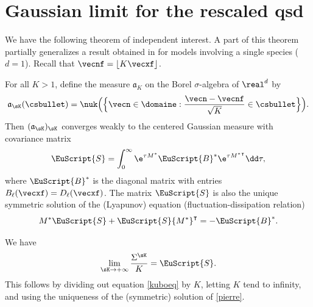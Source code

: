 \section{Gaussian limit for the rescaled qsd}

We have the following theorem of independent interest. A part of this theorem partially generalizes a result obtained
in \cite{ccm1} for models involving a single species ($d=1$). Recall that $\vecnf = \lfloor K\vecxf \rfloor$.
\begin{theorem}
\label{confinement}
For all $K>1$, define the measure $\mathfrak{a}_K$ on the Borel $\sigma$-algebra of $\real^d$ by
\[
\mathfrak{a}_{\sK}(\csbullet)=\nuk\Bigl(\Bigl\{ \vecn\in \domaine : \frac{\vecn-\vecnf}{\sqrt{K}}\in \csbullet\Bigr\}\Bigr).
\]
Then $(\mathfrak{a}_{\sK})_{\sK}$ converges weakly to the centered Gaussian measure with covariance matrix
\[
\EuScript{S}=\int_{0}^{\infty}\e^{\tau M^*}\EuScript{B}^*\e^{\tau {M^*}^{\intercal}}\dd\tau,
\]
where $\EuScript{B}^*$ is the diagonal matrix with entries $B_{\ell}(\vecxf)=D_{\ell}(\vecxf)$.
The matrix $\EuScript{S}$ is also the unique symmetric solution of the (Lyapunov)
equation (fluctuation-dissipation relation)
\begin{equation}\label{pierre}
M^* \EuScript{S}+\EuScript{S} {M^*}^{\intercal}=-\EuScript{B}^*.
\end{equation}
\end{theorem}

\begin{remark}
We have
\[
\lim_{\sK\to+\infty} \frac{\Sigma^{\sK}}{K}=\EuScript{S}.
\]
This follows by dividing out equation \eqref{kuboeq} by $K$, letting $K$ tend to infinity, and using the uniqueness
of the (symmetric) solution of \eqref{pierre}.
\end{remark}


